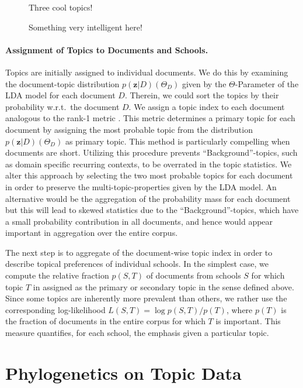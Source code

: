 \documentclass[a4paper,10pt]{article}
\newcommand{\TODO}[1]{\begingroup\color{red}#1\endgroup}
\newcommand{\PFS}[1]{\begingroup\color{blue}#1\endgroup}
\begin{document}
\begin{figure}
  \begin{center} 
    \TODO{Three cool topics!} 
  \end{center}
  \caption{Something very intelligent here!}
  \label{fig:topixampl}
\end{figure}

\paragraph{Assignment of Topics to Documents and Schools.} 

\PFS{Topics are initially assigned to individual documents.} We do this by
examining the document-topic distribution $p(\mathbf{z}|D) (\Theta_D)$
given by the $\Theta$-Parameter of the LDA model for each document
$D$. Therein, we could sort the topics by their probability w.r.t.\ the
document $D$. We assign a topic index to each document analogous to the
rank-1 metric \cite{evans:2014}. This metric determines a primary topic for
each document by assigning the most probable topic from the distribution
$p(\mathbf{z}|D) (\Theta_D)$ as primary topic.  This method is particularly
compelling when documents are short. Utilizing this procedure prevents
``Background''-topics, such as domain specific recurring contexts, to be
overrated in the topic statistics. We alter this approach by selecting the
two most probable topics for each document in order to preserve the
multi-topic-properties given by the LDA model. An alternative would be the
aggregation of the probability mass for each document but this will lead to
skewed statistics due to the ``Background''-topics, which have a small
probability contribution in all documents, \PFS{and hence would appear
  important in aggregation over the entire corpus.}

The next step is to aggregate of the document-wise topic index in order to
describe topical preferences of individual schools.  In the simplest case,
we compute the relative fraction $p(S,T)$ of documents from schools $S$ for
which topic $T$ in assigned as the primary or secondary topic in the sense
defined above.  Since some topics are inherently more prevalent than
others, we rather use the corresponding log-likelihood $L(S,T) = \log
p(S,T)/p(T)$, where $p(T)$ is the fraction of documents in the entire
corpus for which $T$ is important. This measure quantifies, for each
school, the emphasis given a particular topic.

\section{Phylogenetics on Topic Data} 
\end{document}
